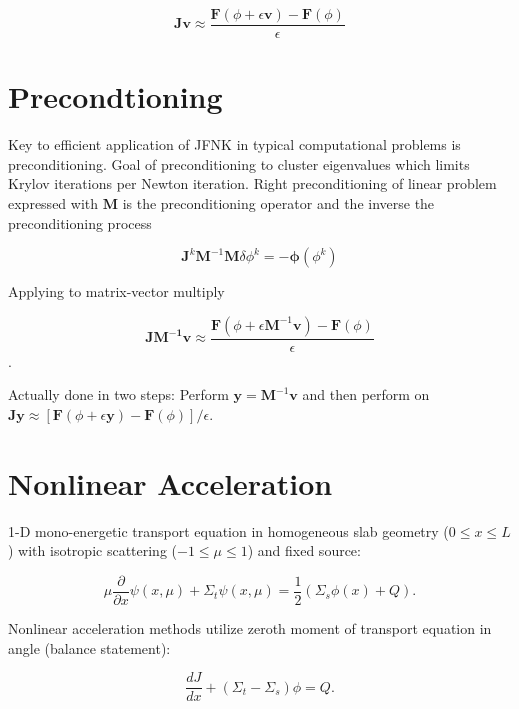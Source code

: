 \documentclass{article}
\begin{document}
\begin{equation*}
\mathbf{Jv} \approx \frac{\mathbf{F}(\phi + \epsilon \mathbf{v}) - \mathbf{F}(\phi)}{\epsilon}
\end{equation*}

\section*{Precondtioning}

Key to efficient application of JFNK in typical computational problems is preconditioning. Goal of preconditioning to cluster eigenvalues  which limits Krylov iterations per Newton iteration. Right preconditioning of linear problem expressed with $\mathbf{M}$ is the preconditioning operator and the inverse the preconditioning process 

\begin{equation*}
\mathbf{J}^k \mathbf{M}^{-1} \mathbf{M}  \delta \phi^k = -\mathbf{\phi}(\phi^k)
\end{equation*}

Applying to matrix-vector multiply

\begin{equation*}
\mathbf{JM^{-1}v} \approx \frac{\mathbf{F}(\phi + \epsilon \mathbf{M}^{-1} \mathbf{v}) - \mathbf{F}(\phi)}{\epsilon}
\end{equation*}.

Actually done in two steps: Perform $\mathbf{y} = \mathbf{M}^{-1} \mathbf{v}$ and then perform on $\mathbf{Jy} \approx [\mathbf{F}(\phi + \epsilon \mathbf{y}) - \mathbf{F}(\phi)] / \epsilon$.

\section*{Nonlinear Acceleration}

1-D mono-energetic transport equation in homogeneous slab geometry ($0 \leq x \leq L$) with isotropic scattering ($-1 \leq \mu \leq 1$) and fixed source:

\begin{equation*}
\mu \frac{\partial}{\partial x} \psi(x,\mu) + \Sigma_t \psi(x,\mu) = \frac{1}{2}(\Sigma_s \phi(x) + Q).
\end{equation*}

Nonlinear acceleration methods utilize zeroth moment of transport equation in angle (balance statement):

\begin{equation*}
\frac{dJ}{dx} + ( \Sigma_t - \Sigma_s) \phi = Q.
\end{equation*}
\end{document}
